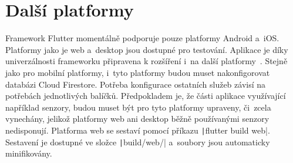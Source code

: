 \section{Další platformy}

Framework Flutter momentálně podporuje pouze platformy Android a~iOS.
Platformy jako je web a~desktop jsou dostupné pro testování.
Aplikace je díky univerzálnosti frameworku připravena k rozšíření i~na další
platformy~\cite{flutter_deploy_web}.
Stejně jako pro mobilní platformy,
i~tyto platformy budou muset nakonfigorovat databázi Cloud Firestore.
Potřeba konfigurace ostatních služeb závisí na potřebách jednotlivých balíčků.
Předpokladem je,
že části aplikace využívající například senzory,
budou muset být pro tyto platformy upraveny,
či~zcela vynechány,
jelikož platformy web ani desktop běžně používanými senzory nedisponují.
Platforma web se sestaví pomocí příkazu \texttt|flutter build web|.
Sestavení je dostupné ve složce \texttt|build/web/|
a~soubory jsou automaticky minifikovány.
